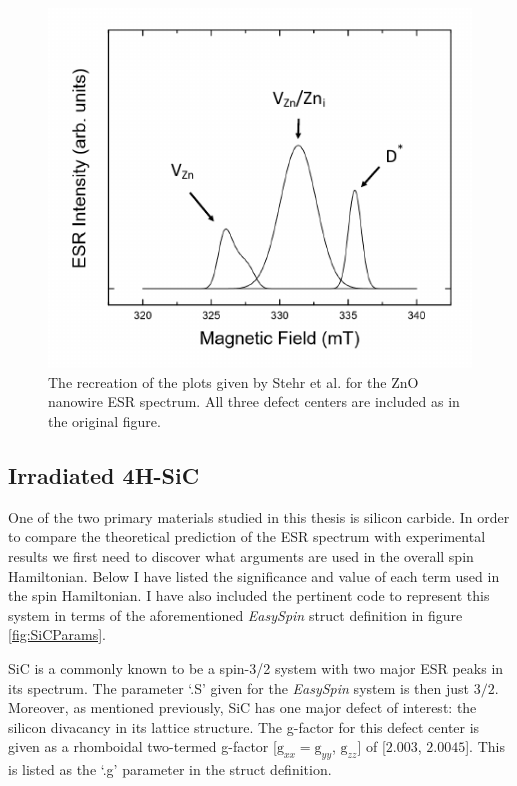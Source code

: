 \documentclass[oneside, astronomy, noacknowlegments]{BYUPhys}
\begin{document}
\begin{figure}
    \centerline{\includegraphics{stehr_rec_fig}}
    \caption[Recreation of ZnO Nanowire ESR]{\label{fig:StehrRec}
     The recreation of the plots given by Stehr et al. for the ZnO nanowire ESR spectrum. All three defect centers are included as in the original figure. }
 \end{figure}

\subsection{Irradiated 4H-SiC}

One of the two primary materials studied in this thesis is silicon carbide. In order to compare the theoretical prediction of the ESR spectrum with experimental results we first need to discover what arguments are used in the overall spin Hamiltonian. Below I have listed the significance and value of each term used in the spin Hamiltonian. I have also included the pertinent code to represent this system in terms of the aforementioned \textit{EasySpin} struct definition in figure \ref{fig:SiCParams}.

SiC is a commonly known to be a spin-3/2 system with two major ESR peaks in its spectrum. The parameter `.S' given for the \textit{EasySpin} system is then just $3/2$. Moreover, as mentioned previously, SiC has one major defect of interest: the silicon divacancy in its lattice structure. The g-factor for this defect center is given as a rhomboidal two-termed g-factor [$\text{g}_{xx}=\text{g}_{yy}$, $\text{g}_{zz}$] of [$2.003$, $2.0045$]. This is listed as the `.g' parameter in the struct definition.
\end{document}
